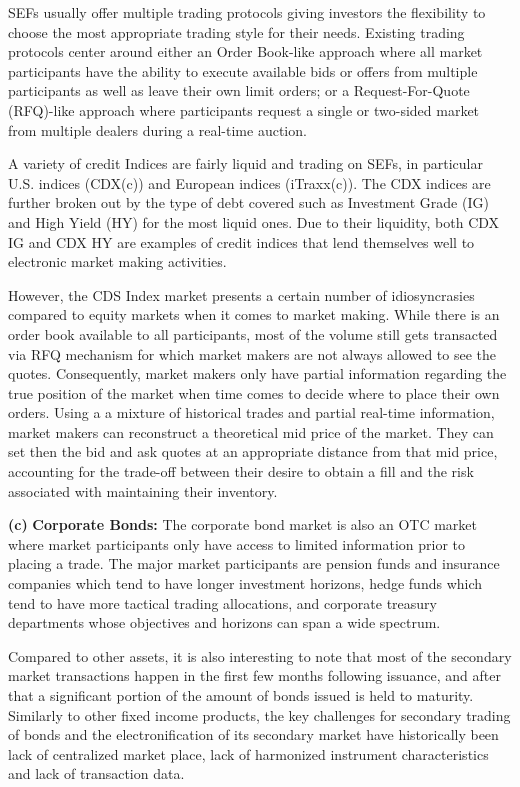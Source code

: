 SEFs usually offer multiple trading protocols giving investors the flexibility to choose the most appropriate trading style for their needs. Existing trading protocols center around either an Order Book-like approach where all market participants have the ability to execute available bids or offers from multiple participants as well as leave their own limit orders; or a Request-For-Quote (RFQ)-like approach where participants request a single or two-sided market from multiple dealers during a real-time auction.


A variety of credit Indices are fairly liquid and trading on SEFs, in particular U.S. indices (CDX(c)) and European indices (iTraxx(c)). The CDX indices are further broken out by the type of debt covered such as Investment Grade (IG) and High Yield (HY) for the most liquid ones. Due to their liquidity, both CDX IG and CDX HY are examples of credit indices that lend themselves well to electronic market making activities.


However, the CDS Index market presents a certain number of idiosyncrasies compared to equity markets when it comes to market making. While there is an order book available to all participants, most of the volume still gets transacted via RFQ mechanism for which market makers are not always allowed to see the quotes. Consequently, market makers only have partial information regarding the true position of the market when time comes to decide where to place their own orders. Using a a mixture of historical trades and partial real-time information, market makers can reconstruct a theoretical mid price of the market. They can set then the bid and ask quotes at an appropriate distance from that mid price, accounting for the trade-off between their desire to obtain a fill and the risk associated with maintaining their inventory. \twomedskip


\noindent\textbf{(c)} \textbf{Corporate Bonds:} The corporate bond market is also an OTC market where market participants only have access to limited information prior to placing a trade. The major market participants are pension funds and insurance companies which tend to have longer investment horizons, hedge funds which tend to have more tactical trading allocations, and corporate treasury departments whose objectives and horizons can span a wide spectrum.


Compared to other assets, it is also interesting to note that most of the secondary market transactions happen in the first few months following issuance, and after that a significant portion of the amount of bonds issued is held to maturity. Similarly to other fixed income products, the key challenges for secondary trading of bonds and the electronification of its secondary market have historically been lack of centralized market place, lack of harmonized instrument characteristics and lack of transaction data.


